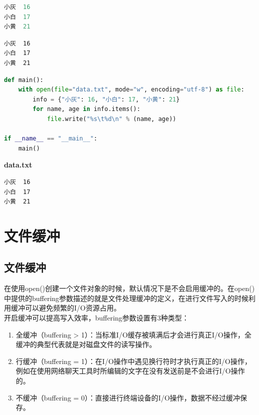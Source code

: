 \begin{lstlisting}[language=Python, title=data.txt]
小灰	16
小白	17
小黄	21
\end{lstlisting}

\begin{tcolorbox}
    \begin{verbatim}
小灰	16
小白	17
小黄	21
	\end{verbatim}
\end{tcolorbox}

\vspace{0.5cm}


\begin{lstlisting}[language=Python]
def main():
    with open(file="data.txt", mode="w", encoding="utf-8") as file:
        info = {"小灰": 16, "小白": 17, "小黄": 21}
        for name, age in info.items():
            file.write("%s\t%d\n" % (name, age))

if __name__ == "__main__":
    main()
\end{lstlisting}

\begin{tcolorbox}
    \textbf{data.txt}
    \begin{verbatim}
小灰	16
小白	17
小黄	21
	\end{verbatim}
\end{tcolorbox}

\newpage

\section{文件缓冲}

\subsection{文件缓冲}

在使用open()创建一个文件对象的时候，默认情况下是不会启用缓冲的。在open()中提供的buffering参数描述的就是文件处理缓冲的定义，在进行文件写入的时候利用缓冲可以避免频繁的I/O资源占用。\\

开启缓冲可以提高写入效率，buffering参数设置有3种类型：

\begin{enumerate}
    \item 全缓冲（buffering > 1）：当标准I/O缓存被填满后才会进行真正I/O操作，全缓冲的典型代表就是对磁盘文件的读写操作。

    \item 行缓冲（buffering = 1）：在I/O操作中遇见换行符时才执行真正的I/O操作，例如在使用网络聊天工具时所编辑的文字在没有发送前是不会进行I/O操作的。

    \item 不缓冲（buffering = 0）：直接进行终端设备的I/O操作，数据不经过缓冲保存。
\end{enumerate}

